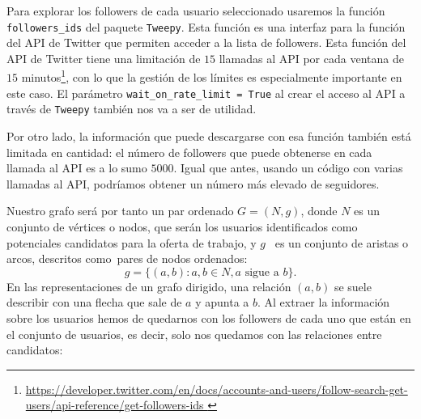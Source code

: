 Para explorar los followers de cada usuario seleccionado usaremos la función 
{\tt followers\_ids} del paquete {\tt Tweepy}. Esta función es una interfaz
para la función del API de Twitter que permiten acceder a la lista de 
followers. Esta función del API de Twitter
tiene una limitación de $15$ llamadas al API por cada ventana de $15$ 
minutos\footnote{\url{https://developer.twitter.com/en/docs/accounts-and-users/follow-search-get-users/api-reference/get-followers-ids }},
con lo que la gestión de los límites es especialmente importante en este caso.
El parámetro {\tt wait\_on\_rate\_limit = True} al crear el acceso al API a 
través de {\tt Tweepy} también nos va a ser de utilidad.

Por otro lado, la información que puede descargarse con esa función también
está limitada en cantidad: el número de followers que puede obtenerse en cada llamada 
al API es a lo sumo $5000$. Igual que antes,
usando un código con varias llamadas al API, podríamos obtener un número más elevado de 
seguidores.

Nuestro grafo será por tanto un par ordenado 
$G=(N,g)$, donde $N$ es un conjunto de vértices o nodos, que serán los usuarios
identificados como potenciales candidatos para la oferta de trabajo, y $g$
 es un conjunto de aristas o arcos, descritos como pares de nodos ordenados:
$$g=\{(a,b): a,b\in N, a \mbox{ sigue a }b\}.$$
En las representaciones de un grafo dirigido, una relación $(a,b)$ se 
suele describir con una flecha que sale de $a$ y apunta a $b$.
Al extraer la información sobre los usuarios hemos de quedarnos con los followers
de cada uno que están en el conjunto de usuarios, es decir, solo nos quedamos con
las relaciones entre candidatos:


